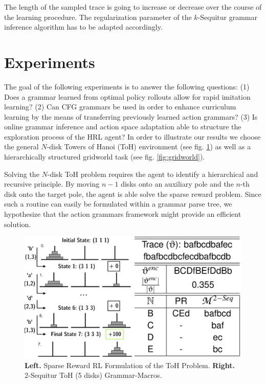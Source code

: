 \documentclass[10pt,letterpaper]{article}
\begin{document}
The length of the sampled trace is going to increase or decrease over the course of the learning procedure. The regularization parameter of the $k$-Sequitur grammar inference algorithm has to be adapted accordingly.

\section{Experiments}

The goal of the following experiments is to answer the following questions: (1) Does a grammar learned from optimal policy rollouts allow for rapid imitation learning? (2) Can CFG grammars be used in order to enhance curriculum learning by the means of transferring previously learned action grammars? (3) Is online grammar inference and action space adaptation able to structure the exploration process of the HRL agent?
In order to illustrate our results we choose the general $N$-disk Towers of Hanoi (ToH) environment (see fig. \ref{fig:hanoi}) as well as a hierarchically structured gridworld task (see fig. \ref{fig:gridworld}).

Solving the $N$-disk ToH problem requires the agent to identify a hierarchical and recursive principle. By moving $n-1$ disks onto an auxiliary pole and the $n$-th disk onto the target pole, the agent is able solve the sparse reward problem. Since such a routine can easily be formulated within a grammar parse tree, we hypothesize that the action grammars framework might provide an efficient solution.


\begin{figure}[H]
    \centering
    \includegraphics[width=\linewidth]{figures/hanoi_grammar.png}
    \caption{\textbf{Left.} Sparse Reward RL Formulation of the ToH Problem. \textbf{Right.} 2-Sequitur ToH (5 disks) Grammar-Macros.}
    \label{fig:hanoi}
 \end{figure}
 
\end{document}
